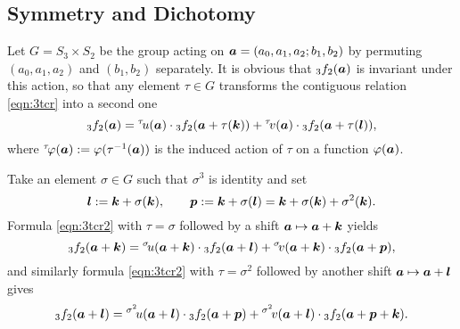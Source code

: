 \documentclass[a4paper,12pt]{article}
\theoremstyle{plain}
\def\ba{\mbox{\boldmath $a$}}
\def\bk{\mbox{\boldmath $k$}}
\def\bl{\mbox{\boldmath $l$}}
\def\bp{\mbox{\boldmath $p$}}
\begin{document}
\subsection{Symmetry and Dichotomy} \label{subsec:types}
Let $G = S_3 \times S_2$ be the group acting on $\ba = (a_0,a_1,a_2; b_1, b_2)$ by 
permuting $(a_0, a_1, a_2)$ and $(b_1, b_2)$ separately.  
It is obvious that ${}_3f_2(\ba)$ is invariant under this action, so that any element 
$\tau \in G$ transforms the contiguous relation \eqref{eqn:3tcr} into a second one      
\begin{equation} \label{eqn:3tcr2}
{}_3f_2(\ba) = {}^{\tau}\!u(\ba) \cdot {}_3f_2(\ba + \tau(\bk)) 
+ {}^{\tau}\!v(\ba) \cdot {}_3f_2(\ba + \tau(\bl)),   
\end{equation} 
where ${}^{\tau}\!\varphi(\ba) := \varphi(\tau^{-1}(\ba))$ is 
the induced action of $\tau$ on a function $\varphi(\ba)$.  
\par
Take an element $\sigma \in G$ such that $\sigma^3$ is identity and set   
\begin{equation} \label{eqn:lp}
\bl := \bk + \sigma(\bk), \qquad 
\bp := \bk + \sigma(\bl) = \bk + \sigma(\bk) + \sigma^2(\bk). 
\end{equation}
Formula \eqref{eqn:3tcr2} with $\tau = \sigma$ followed by a shift  
$\ba \mapsto \ba + \bk$ yields        
\begin{equation} \label{eqn:prolong-k}
{}_3f_2(\ba+\bk) = 
{}^{\sigma}\! u(\ba+\bk) \cdot {}_3f_2(\ba + \bl) 
+ {}^{\sigma}\! v(\ba + \bk) \cdot {}_3f_2(\ba + \bp),    
\end{equation}
and similarly formula \eqref{eqn:3tcr2} with $\tau = \sigma^2$ followed by 
another shift $\ba \mapsto \ba + \bl$ gives       
\begin{equation} \label{eqn:prolong-l}
{}_3f_2(\ba+\bl) = 
{}^{\sigma^2}\! u(\ba+\bl) \cdot {}_3f_2(\ba + \bp) 
+ {}^{\sigma^2}\! v(\ba + \bl) \cdot {}_3f_2(\ba + \bp + \bk).  
\end{equation} 
\end{document}
